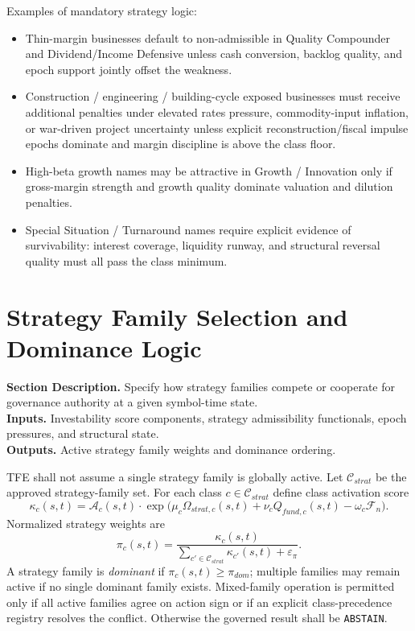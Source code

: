 \documentclass[11pt]{report}
\newcommand{\meta}[3]{\textbf{Section Description.} #1\\
\textbf{Inputs.} #2\\
\textbf{Outputs.} #3\par}
\begin{document}
Examples of mandatory strategy logic:
\begin{itemize}
    \item Thin-margin businesses default to non-admissible in Quality Compounder and Dividend/Income Defensive unless cash conversion, backlog quality, and epoch support jointly offset the weakness.
    \item Construction / engineering / building-cycle exposed businesses must receive additional penalties under elevated rates pressure, commodity-input inflation, or war-driven project uncertainty unless explicit reconstruction/fiscal impulse epochs dominate and margin discipline is above the class floor.
    \item High-beta growth names may be attractive in Growth / Innovation only if gross-margin strength and growth quality dominate valuation and dilution penalties.
    \item Special Situation / Turnaround names require explicit evidence of survivability: interest coverage, liquidity runway, and structural reversal quality must all pass the class minimum.
\end{itemize}


\section{Strategy Family Selection and Dominance Logic}
\meta{Specify how strategy families compete or cooperate for governance authority at a given symbol-time state.}{Investability score components, strategy admissibility functionals, epoch pressures, and structural state.}{Active strategy family weights and dominance ordering.}

TFE shall not assume a single strategy family is globally active. Let $\mathcal{C}_{strat}$ be the approved strategy-family set. For each class $c\in\mathcal{C}_{strat}$ define class activation score
\[
\kappa_c(s,t)=\mathcal{A}_c(s,t)\cdot \exp\big(\mu_c\Omega_{strat,c}(s,t)+\nu_c Q_{fund,c}(s,t)-\omega_c\mathcal{F}_n\big).
\]
Normalized strategy weights are
\[
\pi_c(s,t)=\frac{\kappa_c(s,t)}{\sum_{c'\in\mathcal{C}_{strat}}\kappa_{c'}(s,t)+\varepsilon_{\pi}}.
\]
A strategy family is \emph{dominant} if $\pi_c(s,t)\ge \pi_{dom}$; multiple families may remain active if no single dominant family exists. Mixed-family operation is permitted only if all active families agree on action sign or if an explicit class-precedence registry resolves the conflict. Otherwise the governed result shall be \texttt{ABSTAIN}.
\end{document}
